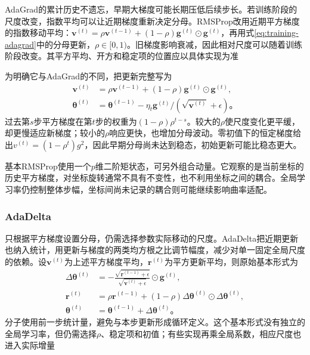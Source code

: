 AdaGrad的累计历史不遗忘，早期大梯度可能长期压低后续步长。若训练阶段的尺度改变，指数平均可以让近期梯度重新决定分母。RMSProp改用近期平方梯度的指数移动平均：$\bm v^{(t)}=\rho\bm v^{(t-1)}+(1-\rho)\bm g^{(t)}\odot\bm g^{(t)}$，再用式\eqref{eq:training-adagrad}中的分母更新，$\rho\in[0,1)$。旧梯度影响衰减，因此相对尺度可以随着训练阶段改变。其平方平均、开方和稳定项的位置应以具体实现为准

为明确它与AdaGrad的不同，把更新完整写为
\begin{equation}
  \begin{aligned}
  \bm v^{(t)}&=\rho\bm v^{(t-1)}+(1-\rho)\bm g^{(t)}\odot\bm g^{(t)},\\
  \bm\theta^{(t)}&=\bm\theta^{(t-1)}-
    \eta_t\bm g^{(t)}/(\sqrt{\bm v^{(t)}}+\epsilon)\text{。}
  \end{aligned}
  \label{eq:training-rmsprop}
\end{equation}
过去第$s$步平方梯度在第$t$步的权重为$(1-\rho)\rho^{t-s}$。较大的$\rho$使尺度变化更平缓，却更慢适应新梯度；较小的$\rho$响应更快，也增加分母波动。零初值下的恒定梯度给出$v^{(t)}=(1-\rho^t)g^2$，因此早期分母尚未达到稳态，初始更新可能比稳态更大。

基本RMSProp使用一个$p$维二阶矩状态，可另外组合动量。它观察的是当前坐标的历史平方梯度，对坐标旋转通常不具有不变性，也不利用坐标之间的耦合。全局学习率仍控制整体步幅，坐标间尚未记录的耦合则可能继续影响曲率适配。

\subsubsection{AdaDelta}
\label{sec:training-adadelta}

只根据平方梯度设置分母，仍需选择参数实际移动的尺度。AdaDelta把近期更新也纳入统计，用更新与梯度的两类均方根之比调节幅度，减少对单一固定全局尺度的依赖。设$\bm v^{(t)}$为上述平方梯度平均，$\bm r^{(t)}$为平方更新平均，则原始基本形式为
\begin{align}
  \Delta\bm\theta^{(t)}&=-\frac{\sqrt{\bm r^{(t-1)}+\epsilon}}
                               {\sqrt{\bm v^{(t)}+\epsilon}}
                                \odot\bm g^{(t)},\\
  \bm r^{(t)}&=\rho\bm r^{(t-1)}+(1-\rho)
      \Delta\bm\theta^{(t)}\odot\Delta\bm\theta^{(t)},\\
  \bm\theta^{(t)}&=\bm\theta^{(t-1)}+\Delta\bm\theta^{(t)}\text{。}
  \label{eq:training-adadelta}
\end{align}
分子使用前一步统计量，避免与本步更新形成循环定义。这个基本形式没有独立的全局学习率，但仍需选择$\rho$、稳定项和初值；有些实现再乘全局系数，相应尺度也进入实际增量

